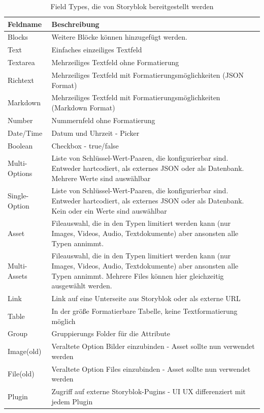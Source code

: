 \begin{longtable}[c]{|l|p{10cm}|}
    \caption{Field Types, die von Storyblok bereitgestellt werden}
    \label{tab:beispiel} \\
    \hline
    \textbf{Feldname} & \textbf{Beschreibung} \\
    \hline
    \endhead
    \hline
    \endfoot
    Blocks & Weitere Blöcke können hinzugefügt werden. \\
    \hline
    Text & Einfaches einzeiliges Textfeld \\
    \hline
    Textarea & Mehrzeiliges Textfeld ohne Formatierung \\
    \hline
    Richtext & Mehrzeiliges Textfeld mit Formatierungsmöglichkeiten (JSON Format) \\
    \hline
    Markdown & Mehrzeiliges Textfeld mit Formatierungsmöglichkeiten (Markdown Format) \\
    \hline
    Number & Nummernfeld ohne Formatierung \\
    \hline
    Date/Time & Datum und Uhrzeit - Picker \\
    \hline
    Boolean & Checkbox - true/false \\
    \hline
    Multi-Options & Liste von Schlüssel-Wert-Paaren, die konfigurierbar sind. Entweder hartcodiert, als externes JSON oder als Datenbank. Mehrere Werte sind auswählbar \\
    \hline
    Single-Option & Liste von Schlüssel-Wert-Paaren, die konfigurierbar sind. Entweder hartcodiert, als externes JSON oder als Datenbank. Kein oder ein Werte sind auswählbar \\
    \hline
    Asset & Fileauswahl, die in den Typen limitiert werden kann (nur Images, Videos, Audio, Textdokumente) aber ansonsten alle Typen annimmt. \\
    \hline
    Multi-Assets & Fileauswahl, die in den Typen limitiert werden kann (nur Images, Videos, Audio, Textdokumente) aber ansonsten alle Typen annimmt. Mehrere Files können hier gleichzeitig ausgewählt werden. \\
    \hline
    Link & Link auf eine Unterseite aus Storyblok oder als externe URL \\
    \hline
    Table & In der größe Formatierbare Tabelle, keine Textformatierung möglich \\
    \hline
    Group & Gruppierungs Folder für die Attribute\\
    \hline
    Image(old) & Veraltete Option Bilder einzubinden - Asset sollte nun verwendet werden \\
    \hline
    File(old) & Veraltete Option Files einzubinden - Asset sollte nun verwendet werden \\
    \hline
    Plugin & Zugriff auf externe Storyblok-Pugins - UI UX differenziert mit jedem Plugin \\
    \hline
\end{longtable}

